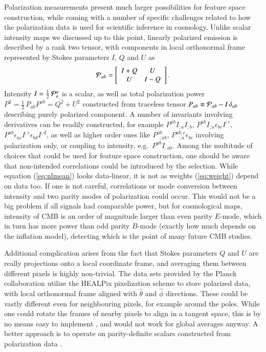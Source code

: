 \documentclass{aa}
\begin{document}
Polarization measurements present much larger possibilities for feature space construction, while coming with a number of specific challenges related to how the polarization data is used for scientific inference in cosmology. Unlike scalar intensity maps we discussed up to this point, linearly polarized emission is described by a rank two tensor, with components in local orthonormal frame represented by Stokes parameters $I$, $Q$ and $U$ as
\begin{equation}
  {\cal P}_{ab} = \left[\begin{array}{cc} I+Q & U\\ U & I-Q\end{array}\right] .
\end{equation}
Intensity $I = \frac{1}{2}\, {\cal P}_a^a$ is a scalar, as well as total polarization power $P^2 = \frac{1}{2}\, P_{ab} P^{ab} = Q^2 + U^2$ constructed from traceless tensor $P_{ab} \equiv {\cal P}_{ab} - I\, \delta_{ab}$ describing purely polarized component. A number of invariants involving derivatives can be readily constructed, for example $P^{ab}I_{;a}I_{;b}$, $P^{ab}I_{;a}\epsilon_{bc}I^{;c}$, $P^{ab}\epsilon_{ac}I^{;c}\epsilon_{bd}I^{;d}$, as well as higher order ones like $P^{ab}_{~~;ab}$, $P^{ab;c}_{~~~;a}\epsilon_{bc}$ involving polarization only, or coupling to intensity, e.g.\ $P^{ab}I_{;ab}$. Among the multitude of choices that could be used for feature space construction, one should be aware that non-intended correlations could be introduced by the selection. While equation (\ref{eq:nlmean}) looks data-linear, it is not as weights (\ref{eq:weight}) depend on data too. If one is not careful, correlations or mode conversion between intensity and two parity modes of polarization could occur. This would not be a big problem if all signals had comparable power, but for cosmological maps, intensity of CMB is an order of magnitude larger than even parity $E$-mode, which in turn has more power than odd parity $B$-mode (exactly how much depends on the inflation model), detecting which is the point of many future CMB studies.

Additional complication arises from the fact that Stokes parameters $Q$ and $U$ are really projections onto a local coordinate frame, and averaging them between different pixels is highly non-trivial. The data sets provided by the Planck collaboration utilize the HEALPix pixelization scheme to store polarized data, with local orthonormal frame aligned with $\hat{\theta}$ and $\hat{\phi}$ directions. These could be vastly different even for neighbouring pixels, for example around the poles. While one could rotate the frames of nearby pixels to align in a tangent space, this is by no means easy to implement \citep{2020A&A...641A...7P}, and would not work for global averages anyway. A better approach is to operate on parity-definite scalars constructed from polarization data \citep{1997PhRvD..55.1830Z}.
\end{document}
